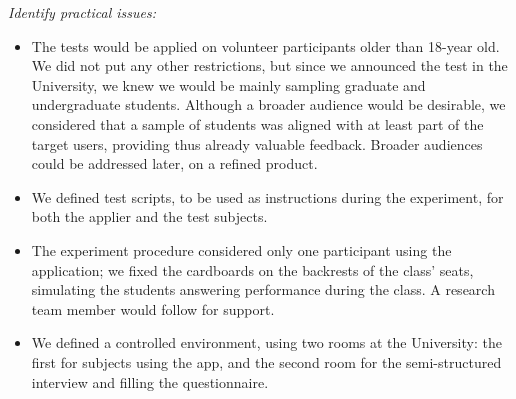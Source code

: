 

\emph{Identify practical issues:}

\begin{itemize}
    \item The tests would be applied on volunteer participants older than 18-year old. We did not put any other restrictions, but since we announced the test in the University, we knew we would be mainly sampling graduate and undergraduate students. Although a broader audience would be desirable, we considered that a sample of students was aligned with at least part of the target users, providing thus already valuable feedback. Broader audiences could be addressed later, on a refined product.

    \item We defined test scripts, to be used as instructions during the experiment, for both the applier and the test subjects.

    \item The experiment procedure considered only one participant using the application; we fixed the cardboards on the backrests of the class' seats, simulating the students answering performance during the class. A research team member would follow for support.

    \item We defined a controlled environment, using two rooms at the University: the first for subjects using the app, and the second room for the semi-structured interview and filling the questionnaire.
\end{itemize}




